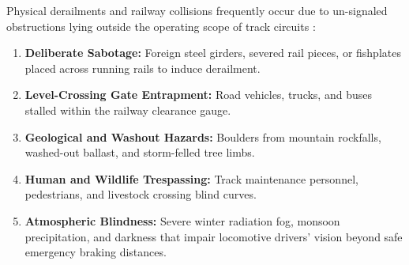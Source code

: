 \documentclass[conference]{IEEEtran}
\begin{document}
Physical derailments and railway collisions frequently occur due to un-signaled obstructions lying outside the operating scope of track circuits \cite{xu2025advancements}:
\begin{enumerate}
    \item \textbf{Deliberate Sabotage:} Foreign steel girders, severed rail pieces, or fishplates placed across running rails to induce derailment.
    \item \textbf{Level-Crossing Gate Entrapment:} Road vehicles, trucks, and buses stalled within the railway clearance gauge.
    \item \textbf{Geological and Washout Hazards:} Boulders from mountain rockfalls, washed-out ballast, and storm-felled tree limbs.
    \item \textbf{Human and Wildlife Trespassing:} Track maintenance personnel, pedestrians, and livestock crossing blind curves.
    \item \textbf{Atmospheric Blindness:} Severe winter radiation fog, monsoon precipitation, and darkness that impair locomotive drivers' vision beyond safe emergency braking distances.
\end{enumerate}
\end{document}
